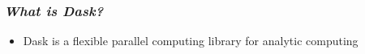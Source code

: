 \begin{frame}
  \frametitle{ \textit{What is Dask?}}
  \begin{itemize}
    \item Dask is a flexible parallel computing library for analytic computing
  \end{itemize}
\end{frame}
